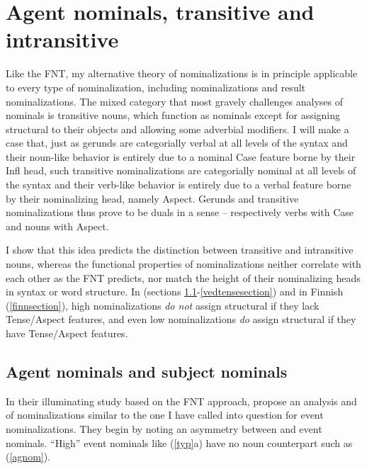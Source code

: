 \documentclass[output=paper,
modfonts
]{LSP/langsci}
\newcommand{\rf}[1]{(\ref{#1})}
\newcommand{\rfa}[2]{(\ref{#1}{#2})}
\begin{document}
\section{Agent nominals, transitive and intransitive}
\label{agentsection}

Like the FNT, my alternative theory of nominalizations is in principle applicable to every type
of nominalization, including  nominalizations and result
nominalizations.  The mixed category that most gravely challenges analyses of  nominals is transitive 
nouns, which function as nominals except for assigning structural  to their objects and
allowing some adverbial modifiers.  I will make a case that, just as gerunds are categorially
verbal at all levels of the syntax and their noun-like behavior is entirely due to a nominal
Case feature borne by their Infl head, such transitive  nominalizations are categorially
nominal at all levels of the syntax and their verb-like behavior is entirely due to a verbal
feature borne by their nominalizing head, namely Aspect.  Gerunds and transitive
nominalizations thus prove to be duals in a sense – respectively verbs with Case and nouns with
Aspect.

I show that this idea predicts the distinction between transitive and intransitive  nouns,
whereas the functional properties of nominalizations neither correlate with
each other as the FNT predicts, nor match the height of their nominalizing heads in syntax or
word structure.  In   (sections \ref{vedagentsection}-\ref{vedtensesection}) and
in Finnish (\ref{finnsection}), high  nominalizations \textit{do not} assign structural
 if they lack Tense/Aspect features, and even low  nominalizations \textit{do} assign
structural  if they have Tense/Aspect features.  

\subsection{Agent nominals and subject nominals}
\label{vedagentsection}

In their illuminating study based on the FNT approach, \citet{baker2009} propose an analysis
and  of  nominalizations similar to the one I have called into question for event
nominalizations.  They begin by noting an asymmetry between  and event nominals.  ``High''
event nominals like \rfa{typ}{a} have no  noun counterpart such as \rf{agnom}.\largerpage
\end{document}
